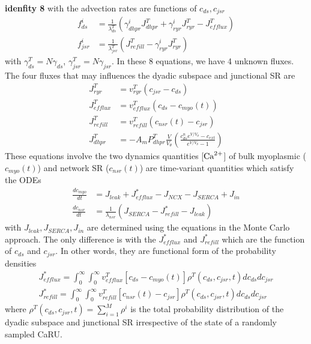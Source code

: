 {\bf idenfity 8} with the advection rates are functions of $c_{ds},
c_{jsr}$
\begin{equation}
  \label{eq:200}
  \begin{split}
      f^i_{ds} &= \frac{1}{\lambda^T_{ds}} \left( \gamma^i_{dhpr}J^T_{dhpr}
      + \gamma^i_{ryr}J^T_{ryr} - J^T_{efflux}  \right) \\
  f^i_{jsr} &= \frac{1}{\lambda^T_{jsr}} \left(J^T_{refill}
      - \gamma^i_{ryr}J^T_{ryr}  \right) 
  \end{split}
\end{equation}
with $\gamma^T_{ds} = N\gamma_{ds}$, $\gamma^T_{jsr} =
N\gamma_{jsr}$. In these 8 equations, we have 4 unknown fluxes.  The
four fluxes that may influences the dyadic subspace and junctional SR
are
\begin{eqnarray*}
  J^T_{ryr} &= v^T_{ryr} (c_{jsr} - c_{ds})\\
  J^T_{efflux} &= v^T_{efflux} (c_{ds} - c_{myo}(t)) \\
  J^T_{refill} &= v^T_{refill} (c_{nsr}(t) - c_{jsr}) \\
  J^T_{dhpr} &= -A_m P^T_{dhpr} \frac{V}{V_\theta} \left( \frac{c^n_{ds}e^{V/V_\theta}-c_{ext}}{e^{V/V_\theta}-1}  \right) 
\end{eqnarray*}
These equations involve the two dynamics quantities [${\text{Ca}^{2+}}$] of bulk myoplasmic ($c_{myo}(t)$) and
network SR ($c_{nsr}(t)$) are time-variant quantities which satisfy the ODEs
\begin{eqnarray*}
  \frac{dc_{myo}}{dt} &= J_{leak} + J^*_{efflux} - J_{NCX} - J_{SERCA}
  + J_{in} \\
  \frac{dc_{nsr}}{dt} &= \frac{1}{\lambda_{nsr}} (J_{SERCA} -  J^*_{refill} - J_{leak})
\end{eqnarray*}
with $J_{leak}, J_{SERCA}, J_{in}$ are determined using the equations
in the Monte Carlo approach. The only difference is with the
$J^*_{efflux}$ and $J^*_{refill}$ which are the function of $c_{ds}$
and $c_{jsr}$. In other words, they are functional form of the
probability densities
\begin{eqnarray*}
  J^*_{efflux} = \int^\infty_0 \int^\infty_0 v^T_{efflux} \left[ c_{ds}
    - c_{myo}(t)  \right] \rho^T(c_{ds},c_{jsr}, t)dc_{ds}dc_{jsr}\\
  J^*_{refill} =  \int^\infty_0 \int^\infty_0 v^T_{refill} \left[ c_{nsr}(t)
    - c_{jsr}  \right] \rho^T(c_{ds},c_{jsr}, t)dc_{ds}dc_{jsr}
\end{eqnarray*}
where $\rho^T(c_{ds},c_{jsr},t) = \sum_{i=1}^M \rho^i$ is the total
probability distribution of the dyadic subspace and junctional SR
irrespective of the state of a randomly sampled CaRU.

